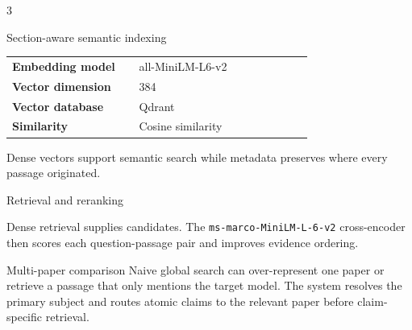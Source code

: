 \documentclass[a0,portrait]{a0poster}
\begin{document}
\begin{multicols}{3}
\begin{posterbox}{Section-aware semantic indexing}
\begin{center}
\renewcommand{\arraystretch}{1.3}
\begin{tabular}{>{\bfseries}p{0.38\linewidth}p{0.52\linewidth}}
Embedding model & all-MiniLM-L6-v2 \\
Vector dimension & 384 \\
Vector database & Qdrant \\
Similarity & Cosine similarity \\
\end{tabular}
\end{center}

Dense vectors support semantic search while metadata preserves where every
passage originated.
\end{posterbox}

\begin{posterbox}{Retrieval and reranking}
\begin{center}
\end{center}

Dense retrieval supplies candidates. The
\texttt{ms-marco-MiniLM-L-6-v2} cross-encoder then scores each
question-passage pair and improves evidence ordering.
\end{posterbox}

\columnbreak

\begin{posterbox}[colframe=PosterCyan]{Multi-paper comparison}
Naive global search can over-represent one paper or retrieve a passage that only
mentions the target model. The system resolves the primary subject and routes
atomic claims to the relevant paper before claim-specific retrieval.

\begin{center}
\end{center}


\end{posterbox}
\end{multicols}
\end{document}
